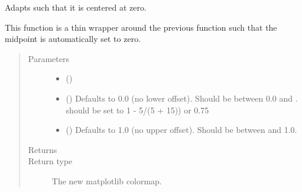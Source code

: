 \documentclass[letterpaper,10pt,english]{sphinxmanual}
\begin{document}

\begin{fulllineitems}
\label{\detokenize{Backend.plotting_customization:Backend.plotting_customization.zeroedColorMap}}
Adapts {\hyperref[\detokenize{Backend.plotting_customization:Backend.plotting_customization.shiftedColorMap}]{}} such that it is centered at zero.

This function is a thin wrapper around the previous function such that
the midpoint is automatically set to zero.
\begin{quote}\begin{description}
\item[{Parameters}] \leavevmode\begin{itemize}
\item {} 
 () \textendash{} 

\item {} 
 () \textendash{} Defaults to 0.0 (no lower offset). Should be between
0.0 and .
should be set to  1 - 5/(5 + 15)) or 0.75

\item {} 
 () \textendash{} Defaults to 1.0 (no upper offset). Should be between
 and 1.0.

\end{itemize}

\item[{Returns}] \leavevmode
{}

\item[{Return type}] \leavevmode
The new matplotlib colormap.

\end{description}\end{quote}

\end{fulllineitems}
\end{document}
